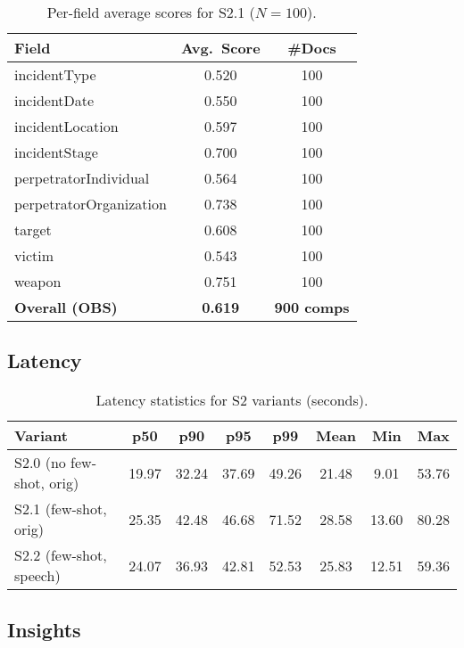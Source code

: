 \begin{table}[H]
    \centering
    \caption{Per-field average scores for S2.1 ($N{=}100$).}
    \label{tab:s2-perfield}
    \begin{tabular}{lcc}
        \toprule
        Field & Avg.\ Score & \#Docs \\
        \midrule
        incidentType & 0.520 & 100 \\
        incidentDate & 0.550 & 100 \\
        incidentLocation & 0.597 & 100 \\
        incidentStage & 0.700 & 100 \\
        perpetratorIndividual & 0.564 & 100 \\
        perpetratorOrganization & 0.738 & 100 \\
        target & 0.608 & 100 \\
        victim & 0.543 & 100 \\
        weapon & 0.751 & 100 \\
        \midrule
        \textbf{Overall (OBS)} & \textbf{0.619} & \textbf{900 comps} \\
        \bottomrule
    \end{tabular}
\end{table}

\subsection*{Latency}

\begin{table}[H]
    \centering
    \caption{Latency statistics for S2 variants (seconds).}
    \label{tab:s2-latency-all}
    \begin{tabular}{lccccccc}
        \toprule
        Variant & p50 & p90 & p95 & p99 & Mean & Min & Max \\
        \midrule
        S2.0 (no few-shot, orig) & 19.97 & 32.24 & 37.69 & 49.26 & 21.48 & 9.01 & 53.76 \\
        S2.1 (few-shot, orig)    & 25.35 & 42.48 & 46.68 & 71.52 & 28.58 & 13.60 & 80.28 \\
        S2.2 (few-shot, speech)  & 24.07 & 36.93 & 42.81 & 52.53 & 25.83 & 12.51 & 59.36 \\
        \bottomrule
    \end{tabular}
\end{table}

\subsection*{Insights}

